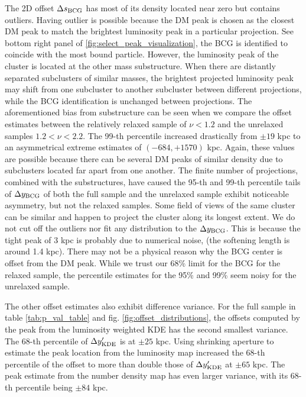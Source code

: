 The 2D offset $\Delta s_{\rm BCG}$ has most of its density located near zero but 
contains outliers. Having outlier is possible 
because the DM peak is chosen as the closest DM peak to match the
brightest luminosity peak in a particular projection.
See bottom right panel of \ref{fig:select_peak_visualization}, the BCG is identified to
coincide with the most bound particle. However, the luminosity peak of the
cluster is located at the other mass substructure. 
When there are distantly separated subclusters of similar masses, 
the brightest projected luminosity peak 
may shift from one subcluster to another subcluster between different projections,
while the BCG identification is unchanged between projections.
The aforementioned bias from substructure can be seen when we compare the
offset estimates between the relatively relaxed sample of $\nu < 1.2$ and the
unrelaxed samples $1.2 < \nu < 2.2$. The 99-th percentile increased drastically
from $\pm 19$ kpc to an asymmetrical extreme estimates of $(-684, +1570)$ kpc.
Again, these values are possible because there can be several DM peaks of
similar density due to subclusters located far apart from one another.
The finite number of projections, combined with the substructures, have caused 
the 95-th and 99-th percentile tails of $\Delta y_{\rm BCG}$ of both the full
sample and the unrelaxed sample exhibit noticeable asymmetry, 
but not the relaxed samples.
Some field of views of the same cluster can be similar and happen to project the
cluster along its longest extent.
We do not cut off the outliers nor fit any distribution to the $\Delta y_{\rm
BCG}$. This is because the tight peak of 3 kpc is probably due to numerical noise, 
(the softening length is around 1.4 kpc). There may not be a physical reason
why the BCG center is offset from the DM peak. 
While we trust our 68\% limit for the BCG for the relaxed sample, 
the percentile estimates for the 95\% and 99\% seem noisy for the unrelaxed sample.


The other offset estimates also exhibit difference variance.
For the full sample in table \ref{tab:p_val_table} and fig. 
\ref{fig:offset_distributions},
the offsets computed by the peak from the luminosity weighted KDE 
has the second smallest variance. The 68-th percentile of $\Delta y_{\rm
KDE}'$ is at $\pm 25$ kpc. Using shrinking aperture to estimate
the peak location from the luminosity map increased the 68-th percentile of the
offset to more than double those of $\Delta y_{\rm KDE}'$ at $\pm 65$ kpc.
The peak estimate from the number density map has even larger variance, 
with its 68-th percentile being $\pm 84$ kpc. 

